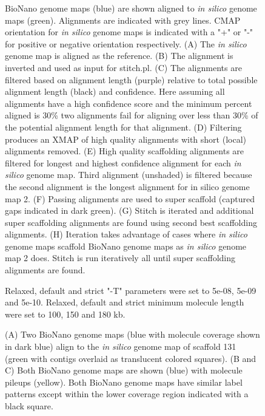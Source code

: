 \documentclass{bmcart}
\begin{document}
\begin{backmatter}
\begin{figure}[h!]
  \end{figure}
  \begin{figure}[h!]
  \caption{
      BioNano genome maps (blue) are shown aligned to \textit{in silico} genome maps (green). Alignments are indicated with grey lines. CMAP orientation for \textit{in silico} genome maps is indicated with a "+" or "-" for positive or negative orientation respectively. (A) The \textit{in silico} genome map is aligned as the reference. (B) The alignment is inverted and used as input for stitch.pl. (C) The alignments are filtered based on alignment length (purple) relative to total possible alignment length (black) and confidence. Here assuming all alignments have a high confidence score and the minimum percent aligned is 30\% two alignments fail for aligning over less than 30\% of the potential alignment length for that alignment. (D) Filtering produces an XMAP of high quality alignments with short (local) alignments removed. (E) High quality scaffolding alignments are filtered for longest and highest confidence alignment for each \textit{in silico} genome map. Third alignment (unshaded) is filtered because the second alignment is the longest alignment for {in silico} genome map 2. (F) Passing alignments are used to super scaffold (captured gaps indicated in dark green). (G) Stitch is iterated and additional super scaffolding alignments are found using second best scaffolding alignments. (H) Iteration takes advantage of cases where \textit{in silico} genome maps scaffold BioNano genome maps as \textit{in silico} genome map 2 does. Stitch is run iteratively all until super scaffolding alignments are found.}
      \end{figure} 
\begin{figure}[h!]
	\caption{
		Relaxed, default and strict "-T" parameters were set to 5e-08, 5e-09 and 5e-10. Relaxed, default and strict minimum molecule length were set to 100, 150 and 180 kb.}
\end{figure}     
\begin{figure}[h!]
	\caption{
		(A) Two BioNano genome maps (blue with molecule coverage shown in dark blue) align to the \textit{in silico} genome map of scaffold 131 (green with contigs overlaid as translucent colored squares). (B and C) Both BioNano genome maps are shown (blue) with molecule pileups (yellow). Both BioNano genome maps have similar label patterns except within the lower coverage region indicated with a black square.}

\end{figure}
\end{backmatter}
\end{document}
